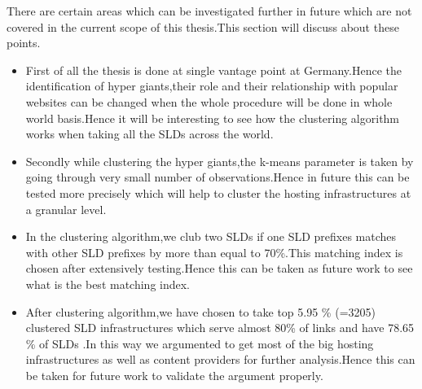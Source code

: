 There are certain areas which can be investigated further in future which are not covered in the current scope of this thesis.This section will discuss about these points.

\begin{itemize}
\item First of all the thesis is done at single vantage point at Germany.Hence the identification of hyper giants,their role and their relationship with popular websites can be changed when the whole procedure will be done in whole world basis.Hence it will be interesting to see how the clustering algorithm works when taking all the SLDs across the world.

\item Secondly while clustering the hyper giants,the k-means parameter is taken by going through very small number of observations.Hence in future this can be tested more precisely which will help to cluster the hosting infrastructures at a granular level.

\item In the clustering algorithm,we club two SLDs if one SLD prefixes matches with other SLD prefixes by more than equal to 70\%.This matching index is chosen after extensively testing.Hence this can be taken as future work to see what is the best matching index.

\item After clustering algorithm,we have chosen to take  top 5.95 \% (=3205) clustered SLD infrastructures which serve almost 80\% of links and have 78.65 \% of SLDs .In this way we argumented to get most of the big hosting infrastructures as well as content providers for further analysis.Hence this can be taken for future work to validate the argument properly.

\end{itemize}